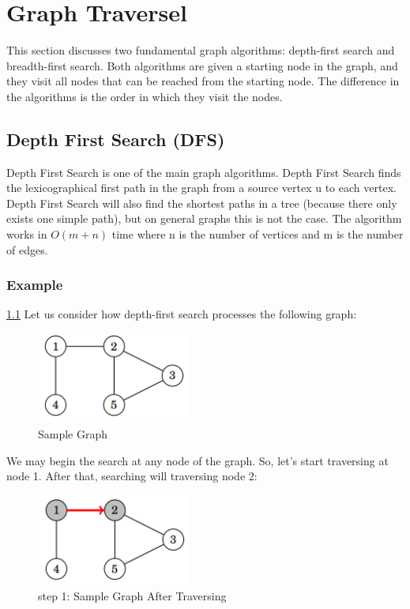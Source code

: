\newpage
\section{Graph Traversel}
This section discusses two fundamental graph algorithms: depth-first search and breadth-first search. Both algorithms are given a starting node in the graph, and they visit all nodes that can be reached from the starting node. The difference in the algorithms is the order in which they visit the nodes.
\subsection{Depth First Search (DFS) }\label{subsection:DFS}
Depth First Search is one of the main graph algorithms. Depth First Search finds the lexicographical first path in the graph from a source vertex u to each vertex. Depth First Search will also find the shortest paths in a tree (because there only exists one simple path), but on general graphs this is not the case. The algorithm works in $O(m+n)$ time where n is the number of vertices and m is the number of edges.

\subsubsection{Example}\ref{subsection:DFS}
Let us consider how depth-first search processes the following graph:

\begin{figure}[h]
    \centering
\includegraphics[width=5cm, height=3cm]{graph-example.png}
 \caption{Sample Graph}
    \label{fig:graph-example}
\end{figure}

We may begin the search at any node of the graph. So, let's start traversing at node 1. After that, searching will traversing node 2:

\begin{figure}[h]
    \centering
\includegraphics[width=5cm, height=3cm]{graph-example-traverse-1.png}
 \caption{step 1: Sample Graph After Traversing}
    \label{fig:graph-example-traverse-1}
\end{figure}

